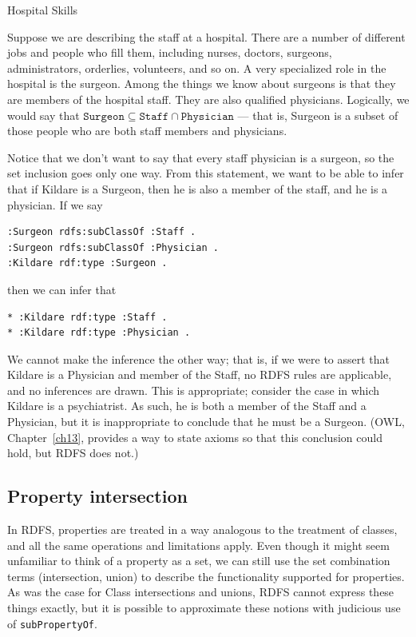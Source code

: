 \begin{example}{Hospital Skills}

Suppose we are describing the staff at a hospital. There are a number of
different jobs and people who fill them, including nurses, doctors,
surgeons, administrators, orderlies, volunteers, and so on. A very
specialized role in the hospital is the surgeon. Among the things we
know about surgeons is that they are members of the hospital staff. They
are also qualified physicians. Logically, we would say that $ \texttt{Surgeon}  \subseteq
\texttt{Staff} \cap \texttt{Physician}$ --- that is, Surgeon is a subset of those people who are
both staff members and physicians.

Notice that we don't want to say that every staff physician is a
surgeon, so the set inclusion goes only one
way. From this statement, we want to be able to infer that if Kildare is
a Surgeon, then he is also a member of the staff, and he is a physician.
If we say

\begin{lstlisting}
:Surgeon rdfs:subClassOf :Staff .
:Surgeon rdfs:subClassOf :Physician .
:Kildare rdf:type :Surgeon .
\end{lstlisting}

then we can infer that

\begin{lstlisting}
* :Kildare rdf:type :Staff .
* :Kildare rdf:type :Physician .
\end{lstlisting}

We cannot make the inference the other way; that is, if we were to
assert that Kildare is a Physician and
member of the Staff, no RDFS rules are applicable, and no inferences are
drawn. This is appropriate; consider the case in which Kildare is a
psychiatrist. As such, he is both a member of the Staff and a Physician,
but it is inappropriate to conclude that he must be a Surgeon. (OWL,
Chapter~\ref{ch13}, provides a way to state axioms so that this  conclusion could
hold, but RDFS does not.)
\end{example}

\subsection{Property intersection}
\label{pintersection}
In RDFS, properties are treated in a way analogous to the treatment of
classes, and all the same operations and limitations apply. Even though
it might seem unfamiliar to think of a property as a set, we can still
use the set combination terms (intersection, union) to describe the
functionality supported for properties. As was the case for Class
intersections and unions, RDFS cannot express these things exactly, but
it is possible to approximate these notions with judicious use of
\texttt{subPropertyOf}.

